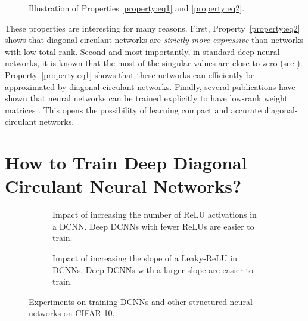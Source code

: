 \begin{figure}[htb]
    \begin{center}
      
    \end{center}
    \caption{Illustration of Properties \ref{property:eq1} and \ref{property:eq2}.}
    \label{figure:p1-ch4-circfig}
\end{figure}

These properties are interesting for many reasons. 
First, Property~\ref{property:eq2} shows that diagonal-circulant networks are \emph{strictly more expressive} than networks with low total rank. 
Second and most importantly, in standard deep neural networks, it is known that the most of the singular values are close to zero (see \eg \citet{sedghi2018singular,arora2019implicit}).
Property~\ref{property:eq1} shows that these networks can efficiently be approximated by diagonal-circulant networks.
Finally, several publications have shown that neural networks can be trained explicitly to have low-rank weight matrices \cite{chong18eccv, goyal2019compression}.
This opens the possibility of learning compact and accurate diagonal-circulant networks.



\section{How to Train Deep Diagonal Circulant Neural Networks?}
\label{section:p1-ch4-how_to_train_deep_diagonal_circulant_neural_networks}

\begin{figure}
   \centering
   \begin{subfigure}[b]{0.49\textwidth}
       \centering
       
       \caption{
	Impact of increasing the number of ReLU activations in a DCNN.
	Deep DCNNs with fewer ReLUs are easier to train.}
       \label{figure:p1-ch4-cifar10_factor}
   \end{subfigure}
   \hfill
   \begin{subfigure}[b]{0.49\textwidth}
       \centering
       
       \caption{
        Impact of increasing the slope of a Leaky-ReLU in DCNNs.
        Deep DCNNs with a larger slope are easier to train.}
       \label{figure:p1-ch4-cifar10_leaky_relu}
   \end{subfigure}
   \caption{Experiments on training DCNNs and other structured neural networks on CIFAR-10.}
\end{figure}


